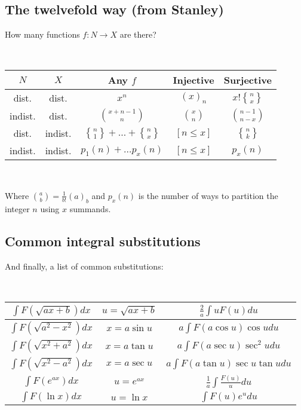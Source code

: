 \documentclass[a4paper]{amsart}
\newcommand{\stirlingsecond}[2]{\genfrac{\{}{\}}{0pt}{}{#1}{#2}}
\begin{document}
\begin{multicols}{2}
    \subsection{The twelvefold way (from Stanley)} How many functions $f \colon N \rightarrow X$ are there?

      \ 

      \begin{tabular}{|c|c|c|c|c|}
        \hline
        $N$ & $X$ & Any $f$ & Injective & Surjective \\ \hline
        dist. & dist. & $x^n$ & $(x)_n$ & $x! \stirlingsecond{n}{x}$ \\ \hline
        indist. & dist. & $\binom{x+n-1}{n}$ & $\binom{x}{n}$ & $\binom{n-1}{n-x}$ \\ \hline
        dist. & indist. & $\stirlingsecond{n}{1} + \ldots + \stirlingsecond{n}{x}$ & $[n \leq x]$ & $\stirlingsecond{n}{k}$ \\ \hline
        indist. & indist. & $p_1(n) + \ldots p_x(n)$ & $[n \leq x]$ & $p_x(n)$ \\ \hline
      \end{tabular}

      \ 

      Where $\binom{a}{b} = \frac{1}{b!}(a)_b $ and $p_x(n)$ is the number of ways to partition the integer $n$ using $x$ summands.

    \subsection{Common integral substitutions} And finally, a list of common substitutions:

      \ 

      \begin{tabular}{|c|c|c|}
        \hline 
        $\int F(\sqrt{ax + b}) dx$ & $u = \sqrt{ax + b}$ & $\frac{2}{a} \int u F(u) du$ \\ \hline
        $\int F(\sqrt{a^2 - x^2}) dx$ & $x = a \sin u$ & $a \int F(a \cos u) \cos u du$ \\ \hline
        $\int F(\sqrt{x^2 + a^2}) dx$ & $x = a \tan u$ & $a \int F(a \sec u) \sec^2 u du$ \\ \hline
        $\int F(\sqrt{x^2 - a^2}) dx$ & $x = a \sec u$ & $a \int F(a \tan u) \sec u \tan u du$ \\ \hline
        $\int F(e^{ax}) dx$ & $u = e^{ax}$ & $\frac{1}{a} \int \frac{F(u)}{u} du$ \\ \hline
        $\int F(\ln x) dx$ & $u = \ln x$ & $\int F(u) e^u du$ \\ \hline
      \end{tabular}


\end{multicols}
\end{document}
